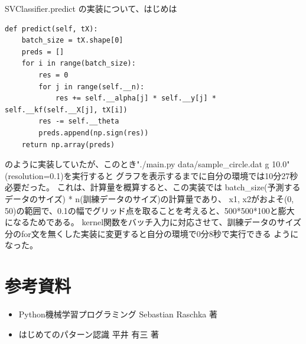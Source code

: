 \documentclass{jsarticle}
\begin{document}
SVClassifier.predict の実装について、はじめは
\begin{lstlisting}
def predict(self, tX):
    batch_size = tX.shape[0]
    preds = []
    for i in range(batch_size):
        res = 0
        for j in range(self.__n):
            res += self.__alpha[j] * self.__y[j] * self.__kf(self.__X[j], tX[i])
        res -= self.__theta
        preds.append(np.sign(res))
    return np.array(preds)
\end{lstlisting}
のように実装していたが、このとき"./main.py data/sample\_circle.dat g 10.0"(resolution=0.1)を実行すると
グラフを表示するまでに自分の環境では10分27秒必要だった。
これは、計算量を概算すると、この実装では batch\_size(予測するデータのサイズ) * n(訓練データのサイズ)の計算量であり、
x1, x2がおよそ(0, 50)の範囲で、0.1の幅でグリッド点を取ることを考えると、500*500*100と膨大になるためである。
kernel関数をバッチ入力に対応させて、訓練データのサイズ分のfor文を無くした実装に変更すると自分の環境で0分8秒で実行できる
ようになった。

\section{参考資料}
\begin{itemize}
    \item Python機械学習プログラミング Sebastian Raschka 著
    \item はじめてのパターン認識 平井 有三 著
\end{itemize}
\end{document}
